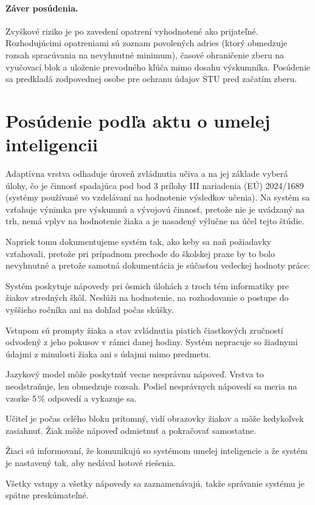 \paragraph{Záver posúdenia.} Zvyškové riziko je po zavedení opatrení vyhodnotené ako prijateľné. Rozhodujúcimi opatreniami sú zoznam povolených adries (ktorý obmedzuje rozsah spracúvania na nevyhnutné minimum), časové ohraničenie zberu na vyučovací blok a uloženie prevodného kľúča mimo dosahu výskumníka. Posúdenie sa predkladá zodpovednej osobe pre ochranu údajov STU pred začatím zberu.

\section{Posúdenie podľa aktu o umelej inteligencii}

Adaptívna vrstva odhaduje úroveň zvládnutia učiva a na jej základe vyberá úlohy, čo je činnosť spadajúca pod bod 3 prílohy III nariadenia (EÚ) 2024/1689~\cite{euaiact2024} (systémy používané vo vzdelávaní na hodnotenie výsledkov učenia). Na systém sa vzťahuje výnimka pre výskumnú a vývojovú činnosť, pretože nie je uvádzaný na trh, nemá vplyv na hodnotenie žiaka a je nasadený výlučne na účel tejto štúdie.

Napriek tomu dokumentujeme systém tak, ako keby sa naň požiadavky vzťahovali, pretože pri prípadnom prechode do školskej praxe by to bolo nevyhnutné a pretože samotná dokumentácia je súčasťou vedeckej hodnoty práce:

\begin{description}[leftmargin=0.6cm, nosep]
    \item[\textbf{Účel a rozsah.}] Systém poskytuje nápovedy pri ôsmich úlohách z troch tém informatiky pre žiakov stredných škôl. Neslúži na hodnotenie, na rozhodovanie o postupe do vyššieho ročníka ani na dohľad počas skúšky.
    \item[\textbf{Údaje.}] Vstupom sú prompty žiaka a stav zvládnutia piatich čiastkových zručností odvodený z jeho pokusov v rámci danej hodiny. Systém nepracuje so žiadnymi údajmi z minulosti žiaka ani s údajmi mimo predmetu.
    \item[\textbf{Známe obmedzenia.}] Jazykový model môže poskytnúť vecne nesprávnu nápoveď. Vrstva to neodstraňuje, len obmedzuje rozsah. Podiel nesprávnych nápovedí sa meria na vzorke 5\,\% odpovedí a vykazuje sa.
    \item[\textbf{Ľudský dohľad.}] Učiteľ je počas celého bloku prítomný, vidí obrazovky žiakov a môže kedykoľvek zasiahnuť. Žiak môže nápoveď odmietnuť a pokračovať samostatne.
    \item[\textbf{Transparentnosť.}] Žiaci sú informovaní, že komunikujú so systémom umelej inteligencie a že systém je nastavený tak, aby nedával hotové riešenia.
    \item[\textbf{Záznam.}] Všetky vstupy a všetky nápovedy sa zaznamenávajú, takže správanie systému je spätne preskúmateľné.
\end{description}

